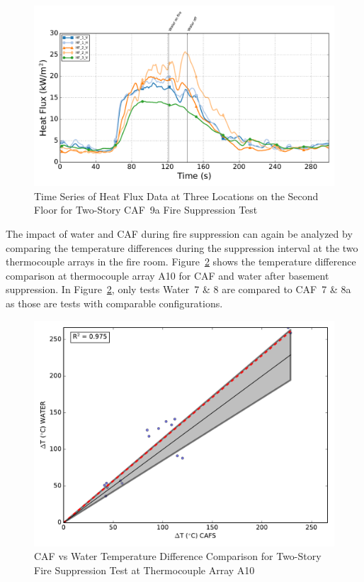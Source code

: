 \documentclass[12pt,oneside]{book}
\begin{document}
\begin{figure}[!ht]
	\includegraphics[width=.85\columnwidth]{../Figures/Script_Figures/Test_41_West_061415_Heat_Flux}
	\caption{Time Series of Heat Flux Data at Three Locations on the Second Floor for Two-Story CAF~9a Fire Suppression Test}
	\label{fig:caf9a_hf}
\end{figure}

The impact of water and CAF during fire suppression can  again be analyzed by comparing the temperature differences during the suppression interval at the two thermocouple arrays in the fire room. Figure~\ref{fig:fs_a10} shows the temperature difference comparison at thermocouple array A10 for CAF and water after basement suppression. In Figure~\ref{fig:fs_a10}, only tests Water~7 \& 8 are compared to CAF~7 \& 8a as those are tests with comparable configurations.

\begin{figure}[!ht]
	\includegraphics[width=.7\columnwidth]{../Figures/Script_Figures/TC_A10_scatter}
	\caption{CAF vs Water Temperature Difference Comparison for Two-Story Fire Suppression Test at Thermocouple Array A10}
	\label{fig:fs_a10}
\end{figure}
\end{document}

